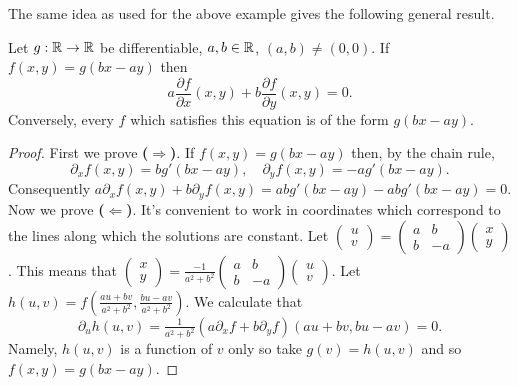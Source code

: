 The same idea as used for the above example gives the following general result.

\begin{theorem}
    Let \(g:\mathbb{R}\to\mathbb{R}\) be differentiable, \(a,b\in \mathbb{R}\), \((a,b)\neq (0,0)\).
    If \(f(x,y)= g(bx-ay)\) then
    \[
        a \frac{\partial f}{\partial x} (x,y) + b \frac{\partial f}{\partial y} (x,y) = 0.
    \]
    Conversely, every \(f\) which satisfies this equation is of the form \(g(bx-ay)\).
\end{theorem}

\begin{proof}
    First we prove \textbf{(\(\boldsymbol\Rightarrow\))}.
    If \(f(x,y)= g(bx-ay)\) then, by the chain rule,
    \[
        \partial_x f(x,y) = bg'(bx-ay),
        \quad
        \partial_y f(x,y) = -ag'(bx-ay).
    \]
    Consequently \(a\partial_x f(x,y) + b \partial_y f(x,y) = a bg'(bx-ay) - abg'(bx-ay) = 0\).
    Now we prove \textbf{(\(\boldsymbol\Leftarrow\))}.
    It's convenient to work in coordinates which correspond to the lines along which the solutions are constant.
    Let \(\left(\begin{smallmatrix}
            u\\ v
        \end{smallmatrix}\right)
    = \left(\begin{smallmatrix}
            a & b \\ b & -a
        \end{smallmatrix}\right)
    \left(\begin{smallmatrix}
            x \\ y
        \end{smallmatrix}\right)\).
    This means that
    \(\left(\begin{smallmatrix}
            x\\ y
        \end{smallmatrix}\right)
    = \frac{-1}{a^2 + b^2} \left(\begin{smallmatrix}
            a & b \\ b & -a
        \end{smallmatrix}\right)
    \left(\begin{smallmatrix}
            u \\ v
        \end{smallmatrix}\right)\).
    Let \(h(u,v)=f(\frac{au + bv}{a^2 + b^2}, \frac{bu-av}{a^2+b^2})\).
    We calculate that
    \[
        \partial_u h(u,v)
        = \tfrac{1}{{a^2 + b^2}}
        \left( a \partial_x f
        + b \partial_y f \right)  (au + bv, bu-av) = 0.
    \]
    Namely, \(h(u,v)\) is a function of \(v\) only so take \(g(v) = h(u,v)\) and so \(f(x,y) = g(bx-ay)\).
\end{proof}

